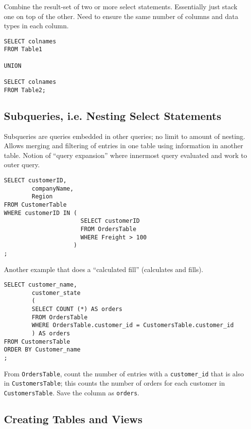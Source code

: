 \documentclass[12pt]{article}
\theoremstyle{plain}
\theoremstyle{definition}
\theoremstyle{remark}
\begin{document}
Combine the result-set of two or more select statements.
Essentially just stack one on top of the other.
Need to ensure the same number of columns and data types in each
column.
\begin{lstlisting}
SELECT colnames
FROM Table1

UNION

SELECT colnames
FROM Table2;
\end{lstlisting}


\clearpage
\subsection{Subqueries, i.e. Nesting Select Statements}

Subqueries are queries embedded in other queries; no limit to amount of
nesting.
Allows merging and filtering of entries in one table using
information in another table.
Notion of ``query expansion'' where innermost query evaluated and
work to outer query.
\begin{lstlisting}
SELECT customerID,
        companyName,
        Region
FROM CustomerTable
WHERE customerID IN (
                      SELECT customerID
                      FROM OrdersTable
                      WHERE Freight > 100
                    )
;
\end{lstlisting}
Another example that does a ``calculated fill'' (calculates and
fills).
\begin{lstlisting}
SELECT customer_name,
        customer_state
        (
        SELECT COUNT (*) AS orders
        FROM OrdersTable
        WHERE OrdersTable.customer_id = CustomersTable.customer_id
        ) AS orders
FROM CustomersTable
ORDER BY Customer_name
;
\end{lstlisting}
From \texttt{OrdersTable}, count the number of entries with a
\texttt{customer\_id} that is also in \texttt{CustomersTable};
this counts the number of orders for each customer in
\texttt{CustomersTable}.
Save the column as \texttt{orders}.






\clearpage
\subsection{Creating Tables and Views}
\end{document}
